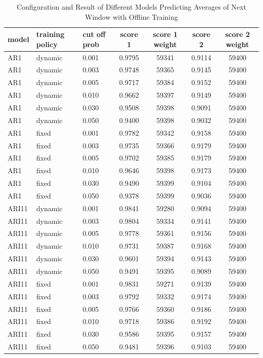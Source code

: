 \documentclass{article}
\begin{document}
\begin{table}[htbp]
  \begin{center}
    \caption{Configuration and Result of Different Models Predicting Averages of Next Window with Offline Training}
    \label{tab:tab1.10.1}
    \begin{tabular}{l|l|l|*{4}{c}} \textbf{model} & \textbf{training policy} &
      \textbf{cut off prob} & \textbf{score 1} & \textbf{score 1 weight} &
      \textbf{score 2} & \textbf{score 2 weight} \\
      \hline
      AR1 & dynamic & 0.001 & 0.9795 & 59341 & 0.9114 & 59400\\
      AR1 & dynamic & 0.003 & 0.9748 & 59365 & 0.9145 & 59400\\
      AR1 & dynamic & 0.005 & 0.9717 & 59384 & 0.9152 & 59400\\
      AR1 & dynamic & 0.010 & 0.9662 & 59397 & 0.9149 & 59400\\
      AR1 & dynamic & 0.030 & 0.9508 & 59398 & 0.9091 & 59400\\
      AR1 & dynamic & 0.050 & 0.9400 & 59398 & 0.9032 & 59400\\
      AR1 & fixed & 0.001 & 0.9782 & 59342 & 0.9158 & 59400\\
      AR1 & fixed & 0.003 & 0.9735 & 59366 & 0.9179 & 59400\\
      AR1 & fixed & 0.005 & 0.9702 & 59385 & 0.9179 & 59400\\
      AR1 & fixed & 0.010 & 0.9646 & 59398 & 0.9173 & 59400\\
      AR1 & fixed & 0.030 & 0.9490 & 59399 & 0.9104 & 59400\\
      AR1 & fixed & 0.050 & 0.9378 & 59399 & 0.9036 & 59400\\
      ARI11 & dynamic & 0.001 & 0.9841 & 59280 & 0.9094 & 59400\\
      ARI11 & dynamic & 0.003 & 0.9804 & 59334 & 0.9141 & 59400\\
      ARI11 & dynamic & 0.005 & 0.9778 & 59361 & 0.9156 & 59400\\
      ARI11 & dynamic & 0.010 & 0.9731 & 59387 & 0.9168 & 59400\\
      ARI11 & dynamic & 0.030 & 0.9601 & 59394 & 0.9143 & 59400\\
      ARI11 & dynamic & 0.050 & 0.9491 & 59395 & 0.9089 & 59400\\
      ARI11 & fixed & 0.001 & 0.9831 & 59271 & 0.9139 & 59400\\
      ARI11 & fixed & 0.003 & 0.9792 & 59332 & 0.9174 & 59400\\
      ARI11 & fixed & 0.005 & 0.9766 & 59360 & 0.9186 & 59400\\
      ARI11 & fixed & 0.010 & 0.9718 & 59386 & 0.9192 & 59400\\
      ARI11 & fixed & 0.030 & 0.9586 & 59395 & 0.9157 & 59400\\
      ARI11 & fixed & 0.050 & 0.9481 & 59396 & 0.9103 & 59400\\
    \end{tabular}
  \end{center}
\end{table}
\end{document}
